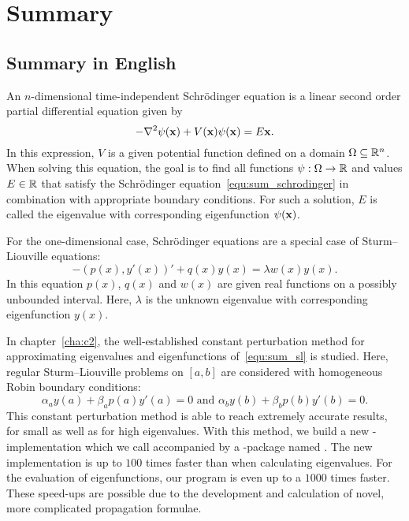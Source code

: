 


\chapter*{Summary}


\section*{Summary in English}

An $n$-dimensional time-independent Schrödinger equation is a linear second order partial differential equation given by
\begin{equation}\label{equ:sum_schrodinger}
-\nabla^2 \psi(\vb{x}) + V(\vb{x}) \psi(\vb{x}) = E\vb{x}\text{.}
\end{equation}
In this expression, $V$ is a given potential function defined on a domain $\Omega \subseteq \mathbb{R}^n$. When solving this equation, the goal is to find all functions $\psi : \Omega \to \mathbb{R}$ and values $E \in \mathbb{R}$ that satisfy the Schrödinger equation~\eqref{equ:sum_schrodinger} in combination with appropriate boundary conditions. For such a solution, $E$ is called the eigenvalue with corresponding eigenfunction $\psi(\vb{x})$.

For the one-dimensional case, Schrödinger equations are a special case of Sturm--Liouville equations:
\begin{equation}\label{equ:sum_sl}
    -(p(x), y'(x))' + q(x) y(x) = \lambda w(x) y(x) \text{.}
\end{equation}
In this equation $p(x)$, $q(x)$ and $w(x)$ are given real functions on a possibly unbounded interval. Here, $\lambda$ is the unknown eigenvalue with corresponding eigenfunction $y(x)$.

In chapter~\ref{cha:c2}, the well-established constant perturbation method for approximating eigenvalues and eigenfunctions of~\eqref{equ:sum_sl} is studied. Here, regular Sturm--Liouville problems on $[a, b]$ are considered with homogeneous Robin boundary conditions:
$$
\alpha_a y(a) + \beta_a p(a) y'(a) = 0 \text{ and } \alpha_b y(b) + \beta_b p(b) y'(b) = 0\text{.}
$$
This constant perturbation method is able to reach extremely accurate results, for small as well as for high eigenvalues. With this method, we build a new \cpp{}-implementation which we call  accompanied by a \lpython{}-package named \pyslise{}. The new implementation is up to $100$ times faster than  when calculating eigenvalues. For the evaluation of eigenfunctions, our program is even up to a $1000$ times faster. These speed-ups are possible due to the development and calculation of novel, more complicated propagation formulae.

